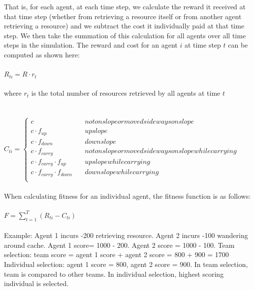 \documentclass[12pt]{article}  %
\begin{document}
That is, for each agent, at each time step, we calculate the reward it received at that time step (whether from retrieving a resource itself or from another agent retrieving a resource) and we subtract the cost it individually paid at that time step. 
We then take the summation of this calculation for all agents over all time steps in the simulation.
The reward and cost for an agent $i$ at time step $t$ can be computed as shown here:\\
\\
$
R_{ti} = R \cdot r_{t}
$\\
\\
where $r_t$ is the total number of resources retrieved by all agents at time $t$
\\
\\
\\
$
C_{ti} = \left\{
        \begin{array}{ll}
            c & \quad not on slope or moved sideways on slope\\
            c \cdot f_{up} & \quad up slope\\
            c \cdot f_{down} & \quad down slope\\
            c \cdot f_{carry} & \quad not on slope or moved sideways on slope while carrying\\
            c \cdot f_{carry} \cdot f_{up} & \quad up slope while carrying \\
            c \cdot f_{carry} \cdot f_{down} & \quad down slope while carrying\\
        \end{array}
    \right.
$
\\
\\
When calculating fitness for an individual agent, the fitness function is as follows:\\
\\
$F = \sum_{t=1}^{T} (R_{ti} - C_{ti}) $
\\
\\
Example: Agent 1 incurs -200 retrieving resource. 
Agent 2 incurs -100 wandering around cache. 
Agent 1 score= 1000 - 200. 
Agent 2 score = 1000 - 100.
Team selection: team score = agent 1 score + agent 2 score = 800 + 900 = 1700
Individual selection: agent 1 score = 800, agent 2 score = 900. 
In team selection, team is compared to other teams. 
In individual selection, highest scoring individual is selected. 
\end{document}
